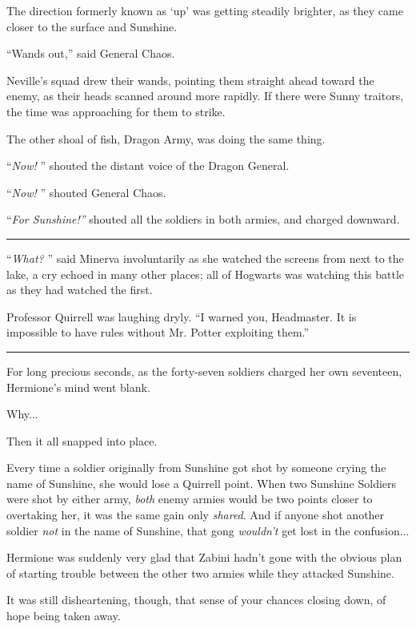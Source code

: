 The direction formerly known as `up' was getting steadily brighter, as
they came closer to the surface and Sunshine.

``Wands out,'' said General Chaos.

Neville's squad drew their wands, pointing them straight ahead toward
the enemy, as their heads scanned around more rapidly. If there were
Sunny traitors, the time was approaching for them to strike.

The other shoal of fish, Dragon Army, was doing the same thing.

``\emph{Now!} '' shouted the distant voice of the Dragon General.

``\emph{Now!} '' shouted General Chaos.

``\emph{For Sunshine!''} shouted all the soldiers in both armies, and
charged downward.

\begin{center}\rule{3in}{0.4pt}\end{center}

``\emph{What?} '' said Minerva involuntarily as she watched the screens
from next to the lake, a cry echoed in many other places; all of
Hogwarts was watching this battle as they had watched the first.

Professor Quirrell was laughing dryly. ``I warned you, Headmaster. It is
impossible to have rules without Mr. Potter exploiting them.''

\begin{center}\rule{3in}{0.4pt}\end{center}

For long precious seconds, as the forty-seven soldiers charged her own
seventeen, Hermione's mind went blank.

Why...

Then it all snapped into place.

Every time a soldier originally from Sunshine got shot by someone crying
the name of Sunshine, she would lose a Quirrell point. When two Sunshine
Soldiers were shot by either army, \emph{both} enemy armies would be two
points closer to overtaking her, it was the same gain only
\emph{shared}. And if anyone shot another soldier \emph{not} in the name
of Sunshine, that gong \emph{wouldn't} get lost in the confusion...

Hermione was suddenly very glad that Zabini hadn't gone with the obvious
plan of starting trouble between the other two armies while they
attacked Sunshine.

It was still disheartening, though, that sense of your chances closing
down, of hope being taken away.

